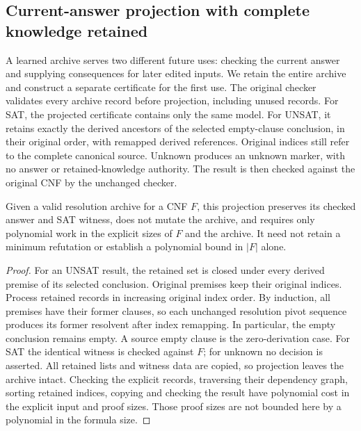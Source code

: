 \subsection{Current-answer projection with complete knowledge retained}
\label{sec:answer-certificate}

A learned archive serves two different future uses: checking the current answer
and supplying consequences for later edited inputs. We retain the entire archive
and construct a separate certificate for the first use. The original checker
validates every archive record before projection, including unused records.
For SAT, the projected certificate contains only the same model. For UNSAT, it
retains exactly the derived ancestors of the selected empty-clause conclusion,
in their original order, with remapped derived references. Original indices
still refer to the complete canonical source. Unknown produces an unknown
marker, with no answer or retained-knowledge authority. The result is then
checked against the original CNF by the unchanged checker.

\begin{samepage}
\begin{proposition}
Given a valid resolution archive for a CNF $F$, this projection preserves its
checked answer and SAT witness, does not mutate the archive, and requires only
polynomial work in the explicit sizes of $F$ and the archive. It need not retain
a minimum refutation or establish a polynomial bound in $|F|$ alone.
\end{proposition}
\end{samepage}
\begin{proof}
For an UNSAT result, the retained set is closed under every derived premise of
its selected conclusion. Original premises keep their original indices.
Process retained records in increasing original index order. By induction, all
premises have their former clauses, so each unchanged resolution pivot sequence
produces its former resolvent after index remapping. In particular, the empty
conclusion remains empty. A source empty clause is the zero-derivation case.
For SAT the identical witness is checked against $F$; for unknown no decision is
asserted. All retained lists and witness data are copied, so projection leaves
the archive intact. Checking the explicit records, traversing their dependency
graph, sorting retained indices, copying and checking the result have polynomial
cost in the explicit input and proof sizes. Those proof sizes are not bounded
here by a polynomial in the formula size.
\end{proof}

